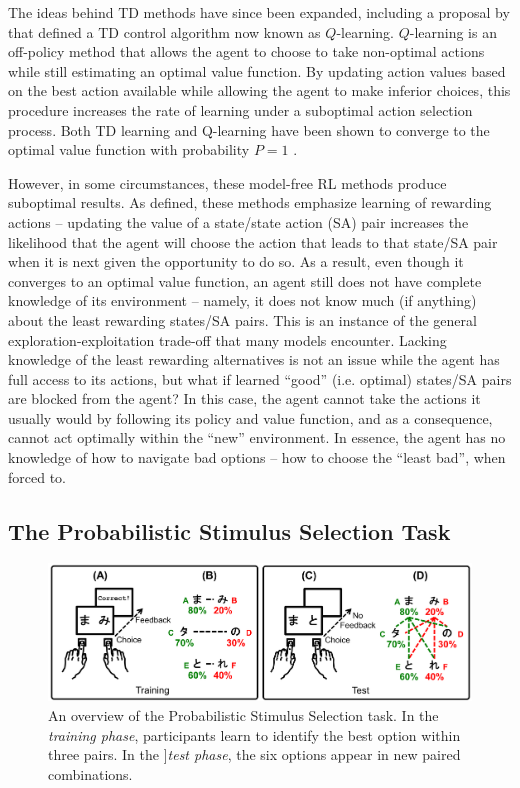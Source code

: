 \documentclass[10pt,letterpaper]{article}
\begin{document}
The ideas behind TD methods have since been expanded, including a proposal by  that defined a TD control algorithm now known as $Q$-learning. $Q$-learning is an off-policy method that allows the agent to choose to take non-optimal actions while still estimating an optimal value function. By updating action values based on the best action available while allowing the agent to make inferior choices, this procedure increases the rate of learning under a suboptimal action selection process. Both TD learning and Q-learning have been shown to converge to the optimal value function with probability $P = 1$ \cite{sutton1998reinforcement}.

However, in some circumstances, these model-free RL methods produce suboptimal results. As defined, these methods emphasize learning of rewarding actions -- updating the value of a state/state action (SA) pair increases the likelihood that the agent will choose the action that leads to that state/SA pair when it is next given the opportunity to do so. As a result, even though it converges to an optimal value function, an agent still does not have complete knowledge of its environment -- namely, it does not know much (if anything) about the least rewarding states/SA pairs. This is an instance of the general exploration-exploitation trade-off that many models encounter. Lacking knowledge of the least rewarding alternatives is not an issue while the agent has full access to its actions, but what if learned ``good'' (i.e. optimal) states/SA pairs are blocked from the agent? In this case, the agent cannot take the actions it usually would by following its policy and value function, and as a consequence, cannot act optimally within the ``new'' environment. In essence, the agent has no knowledge of how to navigate bad options -- how to choose the ``least bad'', when forced to.

\subsection{The Probabilistic Stimulus Selection Task}

\begin{figure}[ht]
	\begin{center}
		\includegraphics[width=6.5in]{pss.png}
	\end{center}
	\caption{An overview of the Probabilistic Stimulus Selection task. In the \emph{training phase}, participants learn to identify the best option within three pairs. In the ]\emph{test phase}, the six options appear in new paired combinations.}
	\label{pss}
\end{figure}
\end{document}
